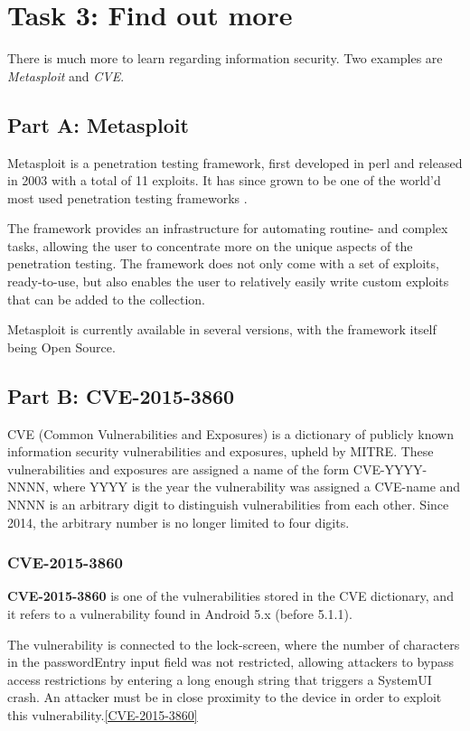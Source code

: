 \section{Task 3: Find out more}
There is much more to learn regarding information security. Two examples
are \textit{Metasploit} and \textit{CVE}.

\subsection{Part A: Metasploit}
Metasploit is a penetration testing framework, first developed in perl and
released in 2003 with a total of 11 exploits\cite{NOSTARCHMETASPLOIT}. It has
since grown to be one of the world'd most used penetration testing frameworks
\cite{METASPLHOME}.

The framework provides an infrastructure for automating routine- and complex
tasks, allowing the user to concentrate more on the unique aspects of the
penetration testing. The framework does not only come with a set of exploits,
ready-to-use, but also enables the user to relatively easily write custom
exploits that can be added to the collection.

Metasploit is currently available in several versions, with the framework
itself being Open Source.\cite{METASPLEDIT}

\subsection{Part B: CVE-2015-3860}
CVE (Common Vulnerabilities and Exposures) is a dictionary of publicly
known information security vulnerabilities and exposures, upheld by
MITRE\cite{CVE}. These vulnerabilities and exposures are assigned a
name of the form CVE-YYYY-NNNN, where YYYY is the year the vulnerability
was assigned a CVE-name and NNNN is an arbitrary digit to distinguish
vulnerabilities from each other. Since 2014, the arbitrary number is no
longer limited to four digits.\cite{CVESYNTAX}

\subsubsection{CVE-2015-3860}
\textbf{CVE-2015-3860} is one of the vulnerabilities stored in the CVE
dictionary, and it refers to a vulnerability found in Android 5.x
(before 5.1.1).

The vulnerability is connected to the lock-screen, where the number of
characters in the passwordEntry input field was not restricted, allowing
attackers to bypass access restrictions by entering a long enough string
that triggers a SystemUI crash. An attacker must be in close proximity
to the device in order to exploit this vulnerability.\ref{CVE-2015-3860}
